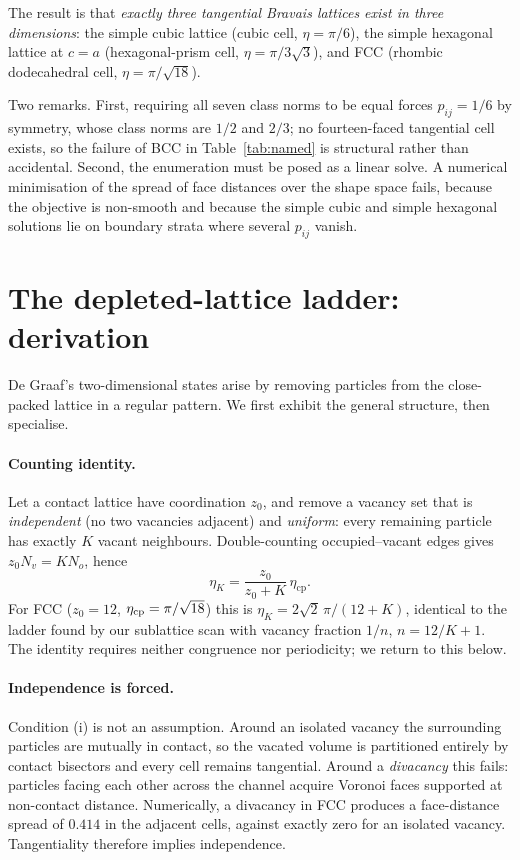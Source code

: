 \documentclass[11pt]{article}
\begin{document}
The result is that \emph{exactly three tangential Bravais lattices exist in three
dimensions}: the simple cubic lattice (cubic cell, $\eta=\pi/6$), the simple
hexagonal lattice at $c=a$ (hexagonal-prism cell, $\eta=\pi/3\sqrt{3}$), and FCC
(rhombic dodecahedral cell, $\eta=\pi/\sqrt{18}$).

Two remarks. First, requiring all seven class norms to be equal forces
$p_{ij}=1/6$ by symmetry, whose class norms are $1/2$ and $2/3$; no fourteen-faced
tangential cell exists, so the failure of BCC in Table~\ref{tab:named} is
structural rather than accidental. Second, the enumeration must be posed as a
linear solve. A numerical minimisation of the spread of face distances over the
shape space fails, because the objective is non-smooth and because the simple
cubic and simple hexagonal solutions lie on boundary strata where several
$p_{ij}$ vanish.

\section{The depleted-lattice ladder: derivation}
\label{sec:ladder}

De Graaf's two-dimensional states arise by removing particles from the
close-packed lattice in a regular pattern. We first exhibit the general
structure, then specialise.

\paragraph{Counting identity.} Let a contact lattice have coordination $z_0$,
and remove a vacancy set that is \emph{independent} (no two vacancies adjacent)
and \emph{uniform}: every remaining particle has exactly $K$ vacant neighbours.
Double-counting occupied--vacant edges gives $z_0 N_v = K N_o$, hence
\begin{equation}
\eta_K=\frac{z_0}{z_0+K}\,\eta_{\mathrm{cp}} .
\label{eq:counting}
\end{equation}
For FCC ($z_0=12$, $\eta_{\rm cp}=\pi/\sqrt{18}$) this is
$\eta_K = 2\sqrt2\,\pi/(12+K)$, identical to the ladder found by our
sublattice scan with vacancy fraction $1/n$, $n=12/K+1$. The identity requires
neither congruence nor periodicity; we return to this below.

\paragraph{Independence is forced.} Condition (i) is not an assumption.
Around an isolated vacancy the surrounding particles are mutually in contact,
so the vacated volume is partitioned entirely by contact bisectors and every
cell remains tangential. Around a \emph{divacancy} this fails: particles facing
each other across the channel acquire Voronoi faces supported at non-contact
distance. Numerically, a divacancy in FCC produces a face-distance spread of
$0.414$ in the adjacent cells, against exactly zero for an isolated vacancy.
Tangentiality therefore implies independence.
\end{document}
